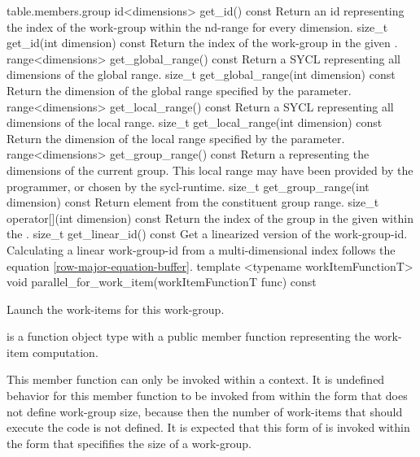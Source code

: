 {table.members.group}
  \addRow
    {id<dimensions> get_id() const}
    {
        Return an \gls{id} representing the index of the work-group
        within the \gls{nd-range} for every dimension.
    }
  \addRow
    {size_t get_id(int dimension) const}
    {
        Return the index of the work-group in the given .
    }
  \addRow
    {range<dimensions> get_global_range() const}
    {
        Return a SYCL  representing all dimensions of the global range.
    }
  \addRow
    {size_t get_global_range(int dimension) const}
    {
        Return the dimension of the global range specified by the  parameter.
    }
  \addRow
    {range<dimensions> get_local_range() const}
    {
        Return a SYCL  representing all dimensions of the local range.
    }
  \addRow
    {size_t get_local_range(int dimension) const}
    {
        Return the dimension of the local range specified by the  parameter.
    }
  \addRow
    {range<dimensions> get_group_range() const}
    {
        Return a  representing the dimensions of the
        current group.  This local range may have been provided by the
        programmer, or chosen by the \gls{sycl-runtime}.
    }
  \addRow
    {size_t get_group_range(int dimension) const}
    {
        Return element  from the constituent group range.
    }
  \addRow
    {size_t operator[](int dimension) const}
    {
        Return the index of the group in the given 
        within the .
    }
  \addRow
    {size_t get_linear_id() const}
    {
        Get a linearized version of the \gls{work-group-id}.
        Calculating a linear \gls{work-group-id}
        from a multi-dimensional index follows the equation \ref{row-major-equation-buffer}.
    }
  \addRowTwoL
    {template <typename workItemFunctionT>}
    {void parallel_for_work_item(workItemFunctionT func) const}
    {
      Launch the work-items for this work-group.

       is a function object type with a public member function
      representing the work-item computation.

      This member function can only be invoked within a
       context.  It is
      undefined behavior for this member function to be invoked
      from within the  form that
      does not define work-group size, because then the number of
      work-items that should execute the code is not defined.  It is
      expected that this form of 
      is invoked within the  form
      that specififies the size of a work-group.
    }

